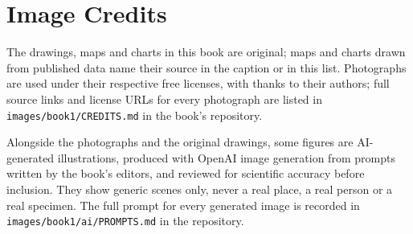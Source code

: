\chapter*{Image Credits}

The drawings, maps and charts in this book are original; maps and charts
drawn from published data name their source in the caption or in this
list. Photographs are used under their respective free licenses, with
thanks to their authors; full source links and license URLs for every
photograph are listed in \texttt{images/book1/CREDITS.md} in the book's
repository.

\bigskip
Alongside the photographs and the original drawings, some figures are
AI-generated illustrations, produced with OpenAI image generation from
prompts written by the book's editors, and reviewed for scientific
accuracy before inclusion. They show generic scenes only, never a real
place, a real person or a real specimen. The full prompt for every
generated image is recorded in \texttt{images/book1/ai/PROMPTS.md} in the
repository.

